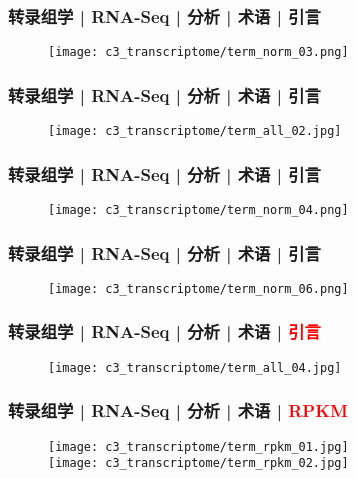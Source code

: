 \begin{frame}
  \frametitle{转录组学 | RNA-Seq | 分析 | 术语 | 引言}
  \begin{figure}
    \centering
    \texttt{[image: c3\_transcriptome/term\_norm\_03.png]}
  \end{figure}
\end{frame}

\begin{frame}
  \frametitle{转录组学 | RNA-Seq | 分析 | 术语 | 引言}
  \begin{figure}
    \centering
    \texttt{[image: c3\_transcriptome/term\_all\_02.jpg]}
  \end{figure}
\end{frame}

\begin{frame}
  \frametitle{转录组学 | RNA-Seq | 分析 | 术语 | 引言}
  \begin{figure}
    \centering
    \texttt{[image: c3\_transcriptome/term\_norm\_04.png]}
  \end{figure}
\end{frame}

\begin{frame}
  \frametitle{转录组学 | RNA-Seq | 分析 | 术语 | 引言}
  \begin{figure}
    \centering
    \texttt{[image: c3\_transcriptome/term\_norm\_06.png]}
  \end{figure}
\end{frame}

\begin{frame}
  \frametitle{转录组学 | RNA-Seq | 分析 | 术语 | \textcolor{red}{引言}}
  \begin{figure}
    \centering
    \texttt{[image: c3\_transcriptome/term\_all\_04.jpg]}
  \end{figure}
\end{frame}

\begin{frame}
  \frametitle{转录组学 | RNA-Seq | 分析 | 术语 | \textcolor{red}{RPKM}}
  \begin{figure}
    \centering
    \texttt{[image: c3\_transcriptome/term\_rpkm\_01.jpg]}\\
    \vspace{1em}
    \texttt{[image: c3\_transcriptome/term\_rpkm\_02.jpg]}
  \end{figure}
\end{frame}

